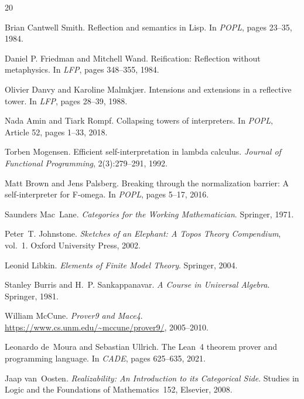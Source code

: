 \documentclass[sigconf,screen]{acmart}
\theoremstyle{remark}
\begin{document}
\begin{thebibliography}{20}

Brian Cantwell Smith.
\newblock Reflection and semantics in {Lisp}.
\newblock In \emph{POPL}, pages 23--35, 1984.

Daniel P. Friedman and Mitchell Wand.
\newblock Reification: Reflection without metaphysics.
\newblock In \emph{LFP}, pages 348--355, 1984.

Olivier Danvy and Karoline Malmkj{\ae}r.
\newblock Intensions and extensions in a reflective tower.
\newblock In \emph{LFP}, pages 28--39, 1988.

Nada Amin and Tiark Rompf.
\newblock Collapsing towers of interpreters.
\newblock In \emph{POPL}, Article 52, pages 1--33, 2018.

Torben Mogensen.
\newblock Efficient self-interpretation in lambda calculus.
\newblock \emph{Journal of Functional Programming}, 2(3):279--291, 1992.

Matt Brown and Jens Palsberg.
\newblock Breaking through the normalization barrier: A self-interpreter for {F-omega}.
\newblock In \emph{POPL}, pages 5--17, 2016.

Saunders Mac~Lane.
\newblock \emph{Categories for the Working Mathematician}.
\newblock Springer, 1971.

Peter~T. Johnstone.
\newblock \emph{Sketches of an Elephant: A Topos Theory Compendium}, vol.~1.
\newblock Oxford University Press, 2002.

Leonid Libkin.
\newblock \emph{Elements of Finite Model Theory}.
\newblock Springer, 2004.

Stanley Burris and H.~P. Sankappanavar.
\newblock \emph{A Course in Universal Algebra}.
\newblock Springer, 1981.

William McCune.
\newblock \emph{Prover9 and Mace4}.
\newblock \url{https://www.cs.unm.edu/~mccune/prover9/}, 2005--2010.

Leonardo de~Moura and Sebastian Ullrich.
\newblock The {Lean}~4 theorem prover and programming language.
\newblock In \emph{CADE}, pages 625--635, 2021.

Jaap van~Oosten.
\newblock \emph{Realizability: An Introduction to its Categorical Side}.
\newblock Studies in Logic and the Foundations of Mathematics~152, Elsevier, 2008.


\end{thebibliography}
\end{document}
